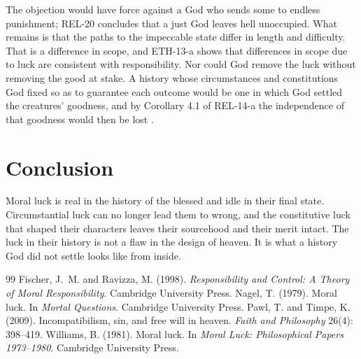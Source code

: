 \documentclass{situationist-preprint}
\begin{document}
\begin{reply}
The objection would have force against a God who sends some to endless punishment; REL-20 concludes that a just God leaves hell unoccupied. What remains is that the paths to the impeccable state differ in length and difficulty. That is a difference in scope, and ETH-13-a shows that differences in scope due to luck are consistent with responsibility. Nor could God remove the luck without removing the good at stake. A history whose circumstances and constitutions God fixed so as to guarantee each outcome would be one in which God settled the creatures' goodness, and by Corollary 4.1 of REL-14-a the independence of that goodness would then be lost \citep[cf.][]{PawlTimpe2009}.
\end{reply}

\section{Conclusion}

Moral luck is real in the history of the blessed and idle in their final state. Circumstantial luck can no longer lead them to wrong, and the constitutive luck that shaped their characters leaves their sourcehood and their merit intact. The luck in their history is not a flaw in the design of heaven. It is what a history God did not settle looks like from inside.

\begin{thebibliography}{99}\small
{} Fischer, J.~M. and Ravizza, M. (1998). \emph{Responsibility and Control: A Theory of Moral Responsibility}. Cambridge University Press.
 Nagel, T. (1979). Moral luck. In \emph{Mortal Questions}. Cambridge University Press.
 Pawl, T. and Timpe, K. (2009). Incompatibilism, sin, and free will in heaven. \emph{Faith and Philosophy} 26(4): 398--419.
 Williams, B. (1981). Moral luck. In \emph{Moral Luck: Philosophical Papers 1973--1980}. Cambridge University Press.
\end{thebibliography}
\end{document}
